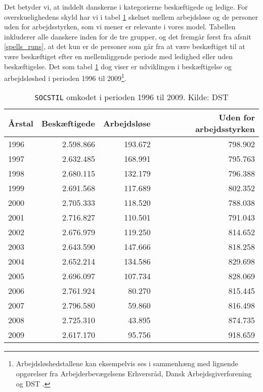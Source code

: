 Det betyder vi, at inddelt danskerne i kategorierne beskæftigede og ledige. For overskuelighedens skyld har vi i tabel \ref{tab_SOCSTIL} skelnet mellem arbejdsløse og de personer uden for arbejdsstyrken, som vi mener er relevante i vores model. Tabellen inkluderer alle danskere inden for de tre grupper, og det fremgår først fra afsnit \ref{spells_runs}, at det kun er de personer som går fra at være beskæftiget til at være beskæftiget efter en mellemliggende periode med ledighed eller uden beskæftigelse. Det som tabel \ref{tab_SOCSTIL} dog viser er udviklingen i beskæftigelse og arbejdsløshed i perioden 1996 til 2009\footnote{Arbejdsløshedstallene kan eksempelvis ses i sammenhæng med lignende opgørelser fra Arbejderbevægelsens Erhversråd\parencite{Bjoersted2012}, Dansk Arbejdsgiverforening \parencite{Bang-Petersen2012} og DST \parencite{DST2014}.}.
%
\begin{table}[H] \centering
\caption{\texttt{SOCSTIL} omkodet i perioden 1996 til 2009. Kilde: DST}
\label{tab_SOCSTIL}
\begin{tabular}{@{}lrrr@{}} \toprule
Årstal & \multicolumn{1}{c}{Beskæftigede} & \multicolumn{1}{c}{Arbejdsløse} & Uden for arbejdsstyrken \\ \midrule
1996  & 2.598.866 & 193.672 & 798.902 \\ 
1997  & 2.632.485 & 168.991 & 795.763 \\ 
1998  & 2.680.115 & 132.179 & 796.388 \\ 
1999  & 2.691.568 & 117.689 & 802.352 \\ 
2000  & 2.705.333 & 118.520 & 788.038 \\ 
2001  & 2.716.827 & 110.501 & 791.043 \\ 
2002  & 2.676.979 & 119.250 & 814.652 \\ 
2003  & 2.643.590 & 147.666 & 818.258 \\ 
2004  & 2.652.214 & 134.586 & 829.698 \\ 
2005  & 2.696.097 & 107.734 & 828.069 \\ 
2006  & 2.761.924 & 80.270  & 815.445 \\ 
2007  & 2.796.580 & 59.860  & 816.498 \\ 
2008  & 2.725.310 & 43.895  & 874.735 \\ 
2009  & 2.617.170 & 95.756  & 918.659 \\  \bottomrule
\end{tabular} \end{table}
% 

